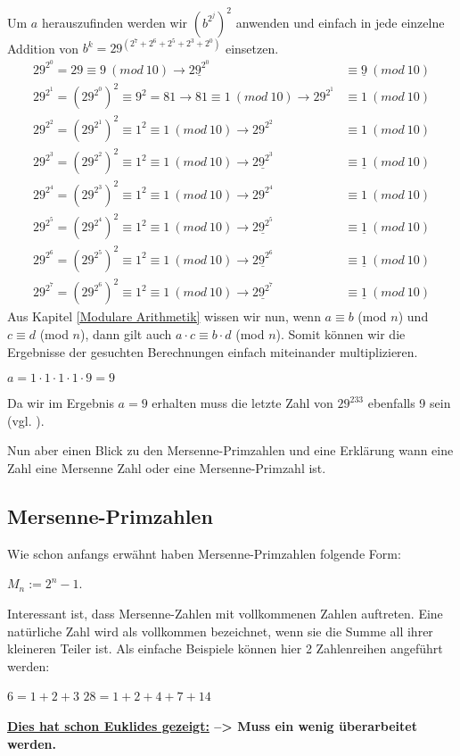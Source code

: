 \documentclass[12pt,a4paper]{article}
\theoremstyle{definition}
\begin{document}
Um $a$ herauszufinden werden wir $(b^{2^j})^2$ anwenden und einfach in jede einzelne Addition von $b^k = 29^{(2^7 + 2^6 + 2^5 + 2^3 + 2^0)}$ einsetzen.
\begin{align}
29^{2^0} = 29 \equiv 9\ (mod\ 10)                           \rightarrow \underline{29^{2^0}} &\equiv \underline{9}\ (mod\ 10) \\
29^{2^1} = (29^{2^0})^2 \equiv 9^2 = 81 \rightarrow 81 \equiv 1\ (mod\ 10) \rightarrow 29^{2^1} &\equiv 1\ (mod\ 10) \\
29^{2^2} = (29^{2^1})^2 \equiv 1^2 \equiv 1\ (mod\ 10) \rightarrow 29^{2^2} &\equiv 1\ (mod\ 10) \\
29^{2^3} = (29^{2^2})^2 \equiv 1^2 \equiv 1\ (mod\ 10) \rightarrow \underline{29^{2^3}} &\equiv \underline{1}\ (mod\ 10) \\
29^{2^4} = (29^{2^3})^2 \equiv 1^2 \equiv 1\ (mod\ 10) \rightarrow 29^{2^4} &\equiv 1\ (mod\ 10) \\
29^{2^5} = (29^{2^4})^2 \equiv 1^2 \equiv 1\ (mod\ 10) \rightarrow \underline{29^{2^5}} &\equiv \underline{1}\ (mod\ 10) \\
29^{2^6} = (29^{2^5})^2 \equiv 1^2 \equiv 1\ (mod\ 10) \rightarrow \underline{29^{2^6}} &\equiv \underline{1}\ (mod\ 10) \\
29^{2^7} = (29^{2^6})^2 \equiv 1^2 \equiv 1\ (mod\ 10) \rightarrow \underline{29^{2^7}} &\equiv \underline{1}\ (mod\ 10)
\end{align}
Aus Kapitel \ref{Modulare Arithmetik} wissen wir nun, wenn $a\equiv b$ (mod $n$) und $c\equiv d$ (mod $n$), dann gilt auch $a \cdot c\equiv b \cdot d$ (mod $n$).
Somit können wir die Ergebnisse der gesuchten Berechnungen einfach miteinander multiplizieren.
\begin{center}
$a = 1 \cdot 1 \cdot 1 \cdot 1 \cdot 9 = 9$
\end{center}
Da wir im Ergebnis $a = 9$ erhalten muss die letzte Zahl von $29^{233}$ ebenfalls 9 sein (vgl. \cite[122]{Arndt2000}).

Nun aber einen Blick zu den Mersenne-Primzahlen und eine Erklärung wann eine Zahl eine Mersenne Zahl oder eine Mersenne-Primzahl ist.

\subsection{Mersenne-Primzahlen}\label{Mersenne-Primzahlen}
Wie schon anfangs erwähnt haben Mersenne-Primzahlen folgende Form:

\begin{center}
$M_n := 2^{n}-1$.
\end{center}
Interessant ist, dass Mersenne-Zahlen mit vollkommenen Zahlen auftreten.
Eine natürliche Zahl wird als vollkommen bezeichnet, wenn sie die Summe all ihrer kleineren Teiler ist.
Als einfache Beispiele können hier 2 Zahlenreihen angeführt werden:
\begin{center}
$6 = 1+2+3$\newline
$28 = 1+2+4+7+14$
\end{center}
\textbf{\underline{Dies hat schon Euklides gezeigt:} --> Muss ein wenig überarbeitet werden.}
\end{document}
